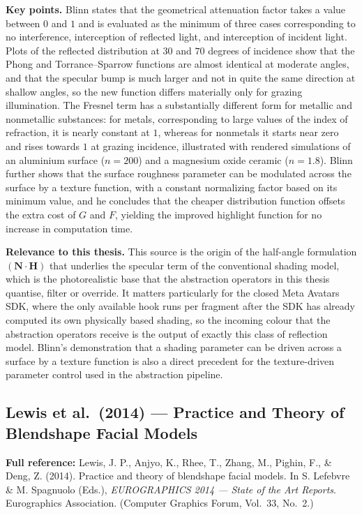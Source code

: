 \documentclass[11pt, a4paper]{article}
\begin{document}
\textbf{Key points.} Blinn states that the geometrical attenuation factor takes a value between $0$ and $1$ and is evaluated as the minimum of three cases corresponding to no interference, interception of reflected light, and interception of incident light. Plots of the reflected distribution at $30$ and $70$ degrees of incidence show that the Phong and Torrance--Sparrow functions are almost identical at moderate angles, and that the specular bump is much larger and not in quite the same direction at shallow angles, so the new function differs materially only for grazing illumination. The Fresnel term has a substantially different form for metallic and nonmetallic substances: for metals, corresponding to large values of the index of refraction, it is nearly constant at $1$, whereas for nonmetals it starts near zero and rises towards $1$ at grazing incidence, illustrated with rendered simulations of an aluminium surface ($n = 200$) and a magnesium oxide ceramic ($n = 1.8$). Blinn further shows that the surface roughness parameter can be modulated across the surface by a texture function, with a constant normalizing factor based on its minimum value, and he concludes that the cheaper distribution function offsets the extra cost of $G$ and $F$, yielding the improved highlight function for no increase in computation time.

\textbf{Relevance to this thesis.} This source is the origin of the half-angle formulation $(\mathbf{N}\cdot\mathbf{H})$ that underlies the specular term of the conventional shading model, which is the photorealistic base that the abstraction operators in this thesis quantise, filter or override. It matters particularly for the closed Meta Avatars SDK, where the only available hook runs per fragment after the SDK has already computed its own physically based shading, so the incoming colour that the abstraction operators receive is the output of exactly this class of reflection model. Blinn's demonstration that a shading parameter can be driven across a surface by a texture function is also a direct precedent for the texture-driven parameter control used in the abstraction pipeline.

\vspace{8pt}

\subsection{Lewis et al.\ (2014) --- Practice and Theory of Blendshape Facial Models}

\begin{refbox}
\textbf{Full reference:} Lewis, J. P., Anjyo, K., Rhee, T., Zhang, M., Pighin, F., \& Deng, Z. (2014). Practice and theory of blendshape facial models. In S. Lefebvre \& M. Spagnuolo (Eds.), \emph{EUROGRAPHICS 2014 --- State of the Art Reports}. Eurographics Association. (Computer Graphics Forum, Vol.\ 33, No.\ 2.)
\end{refbox}
\end{document}
